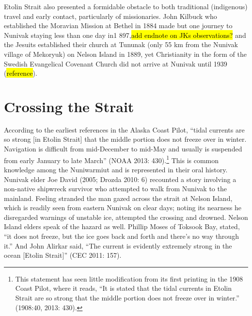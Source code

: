 Etolin Strait also presented a formidable obstacle to both traditional (indigenous) travel and early contact, particularly of missionaries. John Kilbuck who established the Moravian Mission at Bethel in 1884 made but one journey to Nunivak staying less than one day in1 897,\hl{add endnote on JKs observations?} and the Jesuits established their church at Tununak (only 55 km from the Nunivak village of Mekoryuk) on Nelson Island in 1889, yet Christianity in the form of the Swedish Evangelical Covenant Church did not arrive at Nunivak until 1939 (\hl{reference}).


\section{Crossing the Strait}

According to the earliest references in the Alaska Coast Pilot, “tidal currents are so strong {[}in Etolin Strait{]} that the middle portion does not freeze over in winter. Navigation is difficult from mid-December to mid-May and usually is suspended from early January to late March” (NOAA 2013: 430).\footnote{This statement has seen little modification from its first printing in the 1908 Coast Pilot, where it reads, “It is stated that the tidal currents in Etolin Strait are so strong that the middle portion does not freeze over in winter.” (1908:40, 2013: 430).}   This is common knowledge among the Nuniwarmiut and is represented in their oral history. Nunivak elder Joe David (2005; Drozda 2010: 6) recounted a story involving a non-native shipwreck survivor who attempted to walk from Nunivak to the mainland. Feeling stranded the man gazed across the strait at Nelson Island, which is readily seen from eastern Nunivak on clear days; noting its nearness he disregarded warnings of unstable ice, attempted the crossing and drowned. Nelson Island elders speak of the hazard as well. Phillip Moses of Toksook Bay, stated, “it does not freeze, but the ice goes back and forth and there’s no way through it.” And John Alirkar said, “The current is evidently extremely strong in the ocean {[}Etolin Strait{]}” (CEC 2011: 157).

